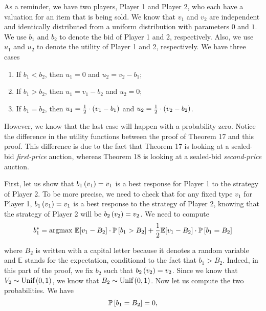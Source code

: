 As a reminder, we have two players, Player 1 and Player 2, who each have a valuation for an item that is being sold. We know that $v_1$ and $v_2$ are independent and identically distributed from a uniform distribution with parameters $0$ and $1$. We use $b_1$ and $b_2$ to denote the bid of Player 1 and 2, respectively. Also, we use $u_1$ and $u_2$ to denote the utility of Player 1 and 2, respectively. We have three cases
\begin{enumerate}
    \item If $b_1 < b_2$, then $u_1 = 0$ and $u_2 = v_2 - b_1$;
    \item If $b_1 > b_2$, then $u_1 = v_1 - b_2$ and $u_2 = 0$;
    \item If $b_1 = b_2$, then $u_1 = \frac{1}{2} \cdot \parent{v_1 - b_1}$ and $u_2 = \frac{1}{2} \cdot \parent{v_2 - b_2}$.
\end{enumerate}

However, we know that the last case will happen with a probability zero.
Notice the difference in the utility functions between the proof of Theorem 17 and this proof. This difference is due to the fact that Theorem 17 is looking at a sealed-bid \textit{first-price} auction, whereas Theorem 18 is looking at a sealed-bid \textit{second-price} auction.

\vspace{5mm}


First, let us show that $b_1 \parent{v_1} = v_1$ is a best response for Player 1 to the strategy of Player 2. To be more precise, we need to check that for any fixed type $v_1$ for Player 1, $b_1 \parent{v_1} = v_1$ is a best response to the strategy of Player 2, knowing that the strategy of Player 2 will be $b_2 \parent{v_2} = v_2$.
We need to compute
\begin{equation*}
    b_1^{*}
    = \text{argmax} \
    \mathbb{E}[v_1 - B_2] \cdot \mathbb{P} \squared{b_1 > B_2}
    + \dfrac{1}{2}  \mathbb{E}[v_1 - B_2] \cdot \mathbb{P} \squared{b_1 = B_2}
\end{equation*}

where $B_2$ is written with a capital letter because it denotes a random variable and $\mathbb{E}$ stands for the expectation, conditional to the fact that $b_1>B_2$.
Indeed, in this part of the proof, we fix $b_2$ such that $b_2 \parent{v_2} = v_2$. Since we know that $V_2 \sim \text{Unif} \parent{0, 1}$, we know that $B_2 \sim \text{Unif} \parent{0, 1}$. Now let us compute the two probabilities. We have
\begin{equation*}
    \mathbb{P} \squared{b_1 = B_2}
    = 0,
\end{equation*}


